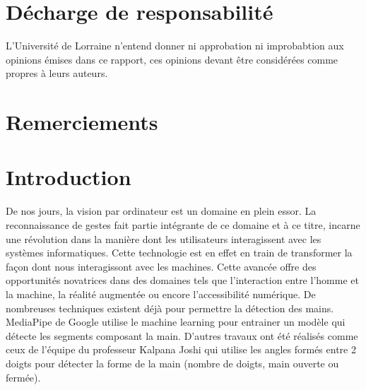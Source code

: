 \documentclass[11pt]{article}
\begin{document}
\newpage \newpage
\section*{Décharge de responsabilité }\bigbreak
L'Université de Lorraine n'entend donner ni approbation  ni improbabtion aux opinions émises dans ce rapport,
ces opinions devant être considérées comme propres à leurs auteurs. \bigbreak

\newpage
\section*{Remerciements}

\newpage
\tableofcontents
\newpage

\setcounter{page}{1}
\section*{Introduction}
De nos jours, la vision par ordinateur est un domaine en plein essor. La reconnaissance de gestes fait partie intégrante de ce domaine et à ce titre, incarne une révolution dans la manière dont les utilisateurs interagissent avec les systèmes informatiques. Cette technologie est en effet en train de transformer la façon dont nous interagissont avec les machines. Cette avancée offre des opportunités novatrices dans des domaines tels que l'interaction entre l'homme et la machine,
la réalité augmentée ou encore l'accessibilité numérique.
De nombreuses techniques existent déjà pour permettre la détection des mains. MediaPipe de Google \cite{mediapipe} utilise le machine learning pour entrainer un modèle qui détecte les segments composant la main. D'autres travaux ont été réalisés comme ceux de l'équipe du professeur Kalpana Joshi \cite{joshi_static_2021} qui utilise les angles formés entre 2 doigts pour détecter la forme de la main (nombre de doigts, main ouverte ou fermée).\bigbreak
\end{document}
